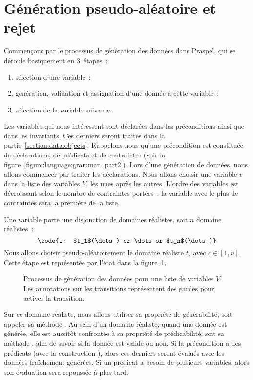 \section{Génération pseudo-aléatoire et rejet}
\label{section:data:random}

Commençons par le processus de génération des données dans Praspel, qui se
déroule basiquement en 3~étapes~:

\begin{enumerate}

\item sélection d'une variable~;

\item génération, validation et assignation d'une donnée à cette variable~;

\item sélection de la variable suivante.

\end{enumerate}

Les variables qui nous intéressent sont déclarées dans les préconditions ainsi
que dans les invariants. Ces derniers seront traités dans la
partie~\ref{section:data:objects}. Rappelons-nous qu'une précondition est
constituée de déclarations, de prédicats et de contraintes (voir la
figure~\ref{figure:language:grammar_part2}). Lors d'une génération de données,
nous allons commencer par traiter les déclarations. Nous allons choisir une
variable $v$ dans la liste des variables $V$, les unes après les autres.
L'ordre des variables est décroissant selon le nombre de contraintes portées~:
la variable avec le plus de contraintes sera la première de la liste.

Une variable porte une disjonction de domaines réalistes, soit $n$ domaine
réalistes~:
%
$$\code{i: $t_1$(\dots) or \dots or $t_n$(\dots)}$$
%
Nous allons choisir pseudo-aléatoirement le domaine réaliste $t_c$ avec $c \in
[1, n]$. Cette étape est représentée par l'état  dans la
figure~\ref{figure:data:process}.
%
\begin{figure}


\caption{\label{figure:data:process} Processus de génération des données pour
une liste de variables $V$. Les annotations sur les transitions représentent des
gardes pour activer la transition.}

\end{figure}
%
Sur ce domaine réaliste, nous allons utiliser sa propriété de générabilité, soit
appeler sa méthode . Au sein d'un domaine réaliste, quand une
donnée est générée, elle est aussitôt confrontée à sa propriété de
prédicabilité, soit sa méthode , afin de savoir si la donnée est
valide ou non. Si la précondition a des prédicats (avec la construction
), alors ces derniers seront évalués avec les données fraîchement
générées. Si un prédicat a besoin de plusieurs variables, alors son évaluation
sera repoussée à plus tard.

